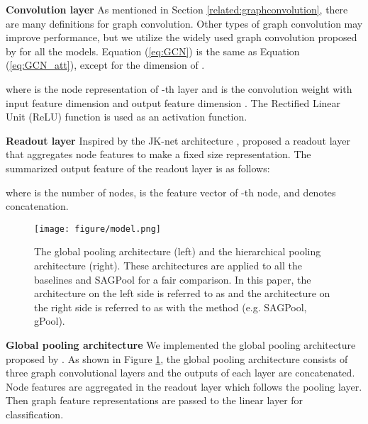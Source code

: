 \documentclass{article}
\begin{document}
\textbf{Convolution layer}
As mentioned in Section \ref{related:graphconvolution}, there are many definitions for graph convolution. Other types of graph convolution may improve performance, but we utilize the widely used graph convolution proposed by \citeauthor{kipf2016semi} for all the models. Equation (\ref{eq:GCN}) is the same as Equation (\ref{eq:GCN_att}), except for the dimension of .

where  is the node representation of -th layer and  is the convolution weight with input feature dimension  and output feature dimension . The Rectified Linear Unit (ReLU) \cite{nair2010rectified} function is used as an activation function.

\textbf{Readout layer}
Inspired by the JK-net architecture \cite{xu2018representation}, \citeauthor{cangea2018towards} proposed a readout layer that aggregates node features to make a fixed size representation. The summarized output feature of the readout layer is as follows:

where  is the number of nodes,  is the feature vector of -th node, and  denotes concatenation.


\begin{figure}[t!]
\vskip 0.2in
\begin{center}
\centerline{\texttt{[image: figure/model.png]}}
\caption{The global pooling architecture (left) and the hierarchical pooling architecture (right). These architectures are applied to all the baselines and SAGPool for a fair comparison. In this paper, the architecture on the left side is referred to as  and the architecture on the right side is referred to as  with the  method (e.g. SAGPool, gPool).}
\label{model}
\end{center}
\vskip -0.2in
\end{figure}

\textbf{Global pooling architecture}
We implemented the global pooling architecture proposed by \citeauthor{zhang2018end}. As shown in Figure \ref{model}, the global pooling architecture consists of three graph convolutional layers and the outputs of each layer are concatenated. Node features are aggregated in the readout layer which follows the pooling layer. Then graph feature representations are passed to the linear layer for classification.
\end{document}
